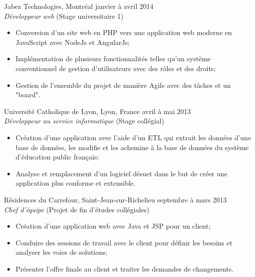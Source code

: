 \documentclass{res}
\begin{document}
\begin{resume}
{	%
	Jabez Technologies, Montréal
	\hfill janvier à avril 2014 \\
	{\sl Développeur web} \hfill (Stage universitaire 1)
	\vspace{0.05in}

	\begin{itemize} \itemsep -2pt
		\item Conversion d’un site web en PHP vers une application web moderne en JavaScript avec NodeJs et AngularJs;
		\item Implémentation de plusieurs fonctionnalités telles qu’un système conventionnel de gestion d’utilisateurs avec des rôles et des droits;
		\item Gestion de l’ensemble du projet de manière Agile avec des tâches et un "board".
	\end{itemize}

	Université Catholique de Lyon, Lyon, France
	\hfill avril à mai 2013 \\
	{\sl Développeur au service informatique} \hfill (Stage collégial)
	\vspace{0.05in}

	\begin{itemize} \itemsep -2pt
		\item Création d’une application avec l’aide d’un ETL qui extrait les données d’une base de données, les modifie et les achemine à la base de données du système d’éducation public français;
		\item Analyse et remplacement d’un logiciel désuet dans le but de créer une application plus conforme et extensible.
	\end{itemize}

	Résidences du Carrefour, Saint-Jean-sur-Richelieu
	\hfill septembre à mars 2013 \\
	{\sl Chef d'équipe} \hfill (Projet de fin d'études collégiales)
	\vspace{0.05in}

	\begin{itemize} \itemsep -2pt
		\item Création d’une application web avec Java et JSP pour un client;
		\item Conduire des sessions de travail avec le client pour définir les besoins et analyser les voies de solutions;
		\item Présenter l’offre finale au client et traiter les demandes de changements.
	\end{itemize}
}


\end{resume}
\end{document}
